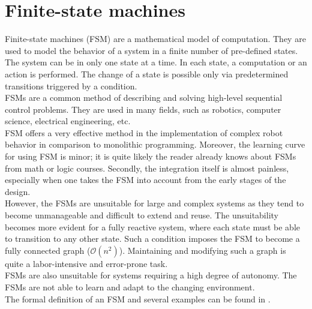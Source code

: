 \section{Finite-state machines}
    Finite-state machines (FSM) are a mathematical model of computation. They are used to model the behavior of a system in a finite number of pre-defined states. The system can be in only one state at a time. In each state, a computation or an action is performed. The change of a state is possible only via predetermined transitions triggered by a condition.\\
    FSMs are a common method of describing and solving high-level sequential control problems. They are used in many fields, such as robotics, computer science, electrical engineering, etc.\\
    FSM offers a very effective method in the implementation of complex robot behavior in comparison to monolithic programming.\cite{FSM_safety} Moreover, the learning curve for using FSM is minor; it is quite likely the reader already knows about FSMs from math or logic courses. Secondly, the integration itself is almost painless, especially when one takes the FSM into account from the early stages of the design.\cite{FSM_intro}\\
    However, the FSMs are unsuitable for large and complex systems as they tend to become unmanageable and difficult to extend and reuse. The unsuitability becomes more evident for a fully reactive system, where each state must be able to transition to any other state. Such a condition imposes the FSM to become a fully connected graph ($\mathcal{O}(n^2)$). Maintaining and modifying such a graph is quite a labor-intensive and error-prone task.\\
    FSMs are also unsuitable for systems requiring a high degree of autonomy. The FSMs are not able to learn and adapt to the changing environment.\\
    The formal definition of an FSM and several examples can be found in \cite{FSM_intro}.


